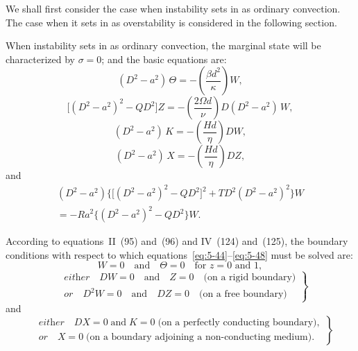 We shall first consider the case when instability sets in as ordinary
convection.  The case when it sets in as overstability is considered in the
following section.

When instability sets in as ordinary convection, the marginal state will be
characterized by $\sigma = 0$; and the basic equations are:
\begin{equation}
  (D^{2}-a^{2})\,\Theta
  = -\left(\frac{\beta d^{2}}{\kappa}\right)W,
  \label{eq:5-44}
\end{equation}
\begin{equation}
  \bigl[(D^{2}-a^{2})^{2}-QD^{2}\bigr]Z
  = -\left(\frac{2\Omega d}{\nu}\right)D(D^{2}-a^{2})\,W,
  \label{eq:5-45}
\end{equation}
\begin{equation}
  (D^{2}-a^{2})\,K
  = -\left(\frac{Hd}{\eta}\right)DW,
  \label{eq:5-46}
\end{equation}
\begin{equation}
  (D^{2}-a^{2})\,X
  = -\left(\frac{Hd}{\eta}\right)DZ,
  \label{eq:5-47}
\end{equation}
and
\begin{multline}
  (D^{2}-a^{2})
  \bigl\{\bigl[(D^{2}-a^{2})^{2}-QD^{2}\bigr]^{2}
  +T D^{2}(D^{2}-a^{2})^{2}\bigr\}W \\
  = -\mathit{Ra}^{2}\bigl\{(D^{2}-a^{2})^{2}-QD^{2}\bigr\}W.
  \label{eq:5-48}
\end{multline}

According to equations~II~(95) and~(96) and IV~(124) and~(125), the
boundary conditions with respect to which equations~\eqref{eq:5-44}--\eqref{eq:5-48}
must be solved are:
\begin{equation}
  W = 0 \quad\text{and}\quad \Theta = 0 \quad\text{for } z = 0 \text{ and } 1,
  \label{eq:5-49}
\end{equation}
\begin{equation}
  \left.
  \begin{aligned}
    &\textit{either}\quad DW = 0 \quad\text{and}\quad Z = 0
      \quad\text{(on a rigid boundary)} \\
    &\textit{or}\quad D^{2}W = 0 \quad\text{and}\quad DZ = 0
      \quad\text{(on a free boundary)}
  \end{aligned}
  \right\}
  \label{eq:5-50}
\end{equation}
and
\begin{equation}
  \left.
  \begin{aligned}
    &\textit{either}\quad DX = 0 \;\text{and}\; K = 0
      \;\text{(on a perfectly conducting boundary)}, \\
    &\textit{or}\quad X = 0
      \;\text{(on a boundary adjoining a non-conducting medium)}.
  \end{aligned}
  \right\}
  \label{eq:5-51}
\end{equation}

